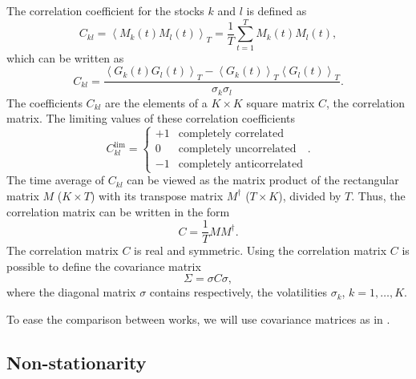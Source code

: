 The correlation coefficient for the stocks $k$ and $l$ is defined as
\cite{non_stationarity_fin_guhr}
\begin{equation}
    C_{kl} = \left\langle M_{k} \left( t \right) M_{l} \left( t \right)
    \right\rangle_{T} = \frac{1}{T} \sum_{t=1}^{T} M_{k} \left( t \right) M_{l}
    \left( t \right),
\end{equation}
which can be written as
\begin{equation}
    C_{kl} = \frac{\left\langle G_{k} \left( t \right) G_{l} \left( t \right)
    \right\rangle_{T} - \left\langle G_{k} \left( t \right) \right\rangle_{T}
    \left\langle G_{l} \left( t \right) \right\rangle_{T}}
    {\sigma_{k} \sigma_{l}}.
\end{equation}
The coefficients $C_{kl}$ are the elements of a $K \times K$ square matrix $C$,
the correlation matrix. The limiting values of these correlation coefficients
\begin{equation}
    C_{kl}^{\text{lim}} =
    \left\{
    \begin{array}{cc}
    +1 & \text{completely correlated}  \\
    0  & \text{completely uncorrelated}\\
    -1 & \text{completely anticorrelated}
    \end{array}
    \right. .
\end{equation}
The time average of $C_{kl}$ can be viewed as the matrix product of the
rectangular matrix $M$ ($K \times T$) with its transpose matrix $M^{\dagger}$
($T \times K$), divided by $T$. Thus, the correlation matrix can be written in
the form
\begin{equation}
    C = \frac{1}{T} M M^{\dagger}.
\end{equation}
The correlation matrix $C$ is real and symmetric. Using the correlation matrix
$C$ is possible to define the covariance matrix
\cite{exact_distributions_guhr,credit_risk_guhr,portfolio_distributions_guhr,asset_correlations_guhr,stochastic_cov_guhr}
\begin{equation}
    \Sigma = \sigma C \sigma ,
\end{equation}
where the diagonal matrix $\sigma$ contains respectively, the volatilities
$\sigma_{k}$, $k = 1, \ldots, K$.

To ease the comparison between works, we will use covariance matrices as in
\cite{non_stationarity_fin_guhr}.

\subsection{Non-stationarity}\label{subsec:non_stationarity}

